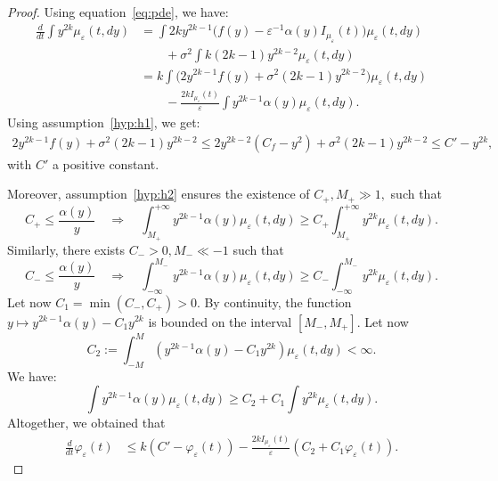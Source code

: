 \documentclass[onefignum,onetabnum]{siamart190516}
\newcommand{\1}{\mathbbm{1}}
\newcommand{\eps}{\varepsilon}
\begin{document}
\begin{proof}
Using equation~\eqref{eq:pde}, we have:
\begin{align*}
\frac{d}{dt}\int y^{2k}\mu_\eps(t,dy) &= \int 2k y^{2k-1}\Big(f(y)-\eps^{-1}\alpha(y)I_{\mu_\eps}(t)\Big)\mu_\eps(t,dy)
\\
&\qquad+\sigma^2\int k(2k-1)y^{2k-2}\mu_\eps(t,dy)
\\
&=k\int \Big(2 y^{2k-1}f(y)+\sigma^2(2k-1)y^{2k-2}\Big)\mu_\eps(t,dy)
\\
&\qquad-\frac{2kI_{\mu_\eps}(t)}{\eps}\int y^{2k-1}\alpha(y)\mu_\eps(t,dy).
\end{align*}
Using assumption~\eqref{hyp:h1}, we get:
\begin{align*}
2 y^{2k-1}f(y)+\sigma^2(2k-1)y^{2k-2}\leq 2y^{2k-2}(C_f-y^2)+\sigma^2(2k-1)y^{2k-2}\leq C'-y^{2k},
\end{align*}
with $C'$ a positive constant. 

Moreover, assumption~\eqref{hyp:h2} ensures the existence of $C_+,M_+\gg1,$ such that
$$
C_+\leq\frac{\alpha(y)}{y}\quad\Rightarrow\quad\int_{M_+}^{+\infty} y^{2k-1}\alpha(y)\mu_\eps(t,dy) \geq C_+\int_{M_+}^{+\infty} y^{2k}\mu_\eps(t,dy).
$$
Similarly, there exists $C_->0,M_-\ll-1$ such that
$$
C_-\leq\frac{\alpha(y)}{y}\quad\Rightarrow\quad\int_{-\infty}^{M_-} y^{2k-1}\alpha(y)\mu_\eps(t,dy) \geq C_-\int_{-\infty}^{M_-} y^{2k}\mu_\eps(t,dy).
$$
Let now $C_1=\min(C_-,C_+)>0$. By continuity, the function $y\mapsto y^{2k-1}\alpha(y)-C_1 y^{2k}$ is bounded on the interval $[M_-,M_+]$. Let now
\[C_2:=\int_{-M}^M(y^{2k-1}\alpha(y)-C_1 y^{2k})\mu_\eps(t,dy)<\infty.\]
We have:
$$
\int y^{2k-1}\alpha(y)\mu_\eps(t,dy)\geq C_2+C_1 \int y^{2k}\mu_\eps(t,dy).
$$
Altogether, we obtained that
\begin{align*}
\frac{d}{dt}\varphi_\eps(t)
&\leq k(C' - \varphi_\eps(t))-\frac{2kI_{\mu_\eps}(t)}{\eps}\left(C_2+C_1\varphi_\eps(t)\right).
\end{align*}


\end{proof}
\end{document}
